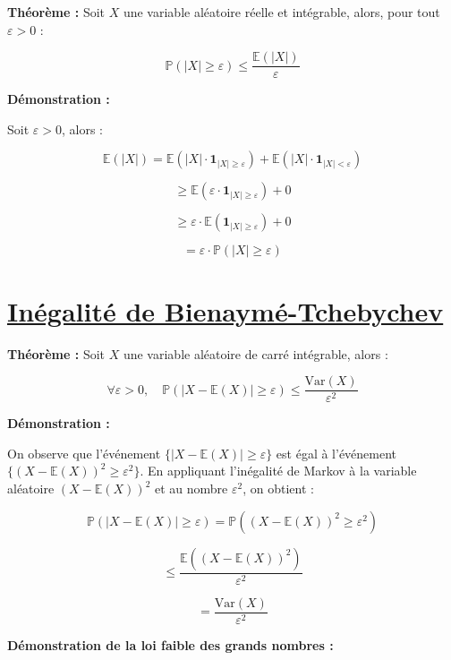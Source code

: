 \documentclass{article}
\begin{document}
\textbf{Théorème :} Soit $X$ une variable aléatoire réelle et intégrable, alors, pour tout $\varepsilon > 0$ :

\[
\mathbb{P}(|X| \geq \varepsilon) \leq \frac{\mathbb{E}(|X|)}{\varepsilon}
\]

\vspace{1cm}
\noindent
\textbf{Démonstration :}

\vspace{0.3cm}
\noindent
Soit $\varepsilon > 0$, alors :

\[
\mathbb{E}(|X|) = \mathbb{E}(|X| \cdot \mathbf{1}_{|X| \geq \varepsilon}) + \mathbb{E}(|X| \cdot \mathbf{1}_{|X| < \varepsilon})
\]

\[
\geq \mathbb{E}(\varepsilon \cdot \mathbf{1}_{|X| \geq \varepsilon}) + 0
\]

\[
\geq \varepsilon \cdot \mathbb{E}(\mathbf{1}_{|X| \geq \varepsilon}) + 0
\]

\[
= \varepsilon \cdot \mathbb{P}(|X| \geq \varepsilon)
\]

\section*{\underline{Inégalité de Bienaymé-Tchebychev}}



\textbf{Théorème :} Soit $X$ une variable aléatoire de carré intégrable, alors :

\[
\forall \varepsilon > 0, \quad \mathbb{P}(|X - \mathbb{E}(X)| \geq \varepsilon) \leq \frac{\text{Var}(X)}{\varepsilon^2}
\]

\vspace{1cm}
\noindent
\textbf{Démonstration :}

\vspace{0.3cm}
\noindent
On observe que l'événement $\{|X - \mathbb{E}(X)| \geq \varepsilon\}$ est égal à l'événement $\{(X - \mathbb{E}(X))^2 \geq \varepsilon^2\}$. En appliquant l'inégalité de Markov à la variable aléatoire $(X - \mathbb{E}(X))^2$ et au nombre $\varepsilon^2$, on obtient :

\[
\mathbb{P}(|X - \mathbb{E}(X)| \geq \varepsilon) = \mathbb{P}((X - \mathbb{E}(X))^2 \geq \varepsilon^2)
\]

\[
\leq \frac{\mathbb{E}((X - \mathbb{E}(X))^2)}{\varepsilon^2}
\]

\[
= \frac{\text{Var}(X)}{\varepsilon^2}
\]

\vspace{1cm}
\noindent
\textbf{Démonstration de la loi faible des grands nombres :}
\end{document}
